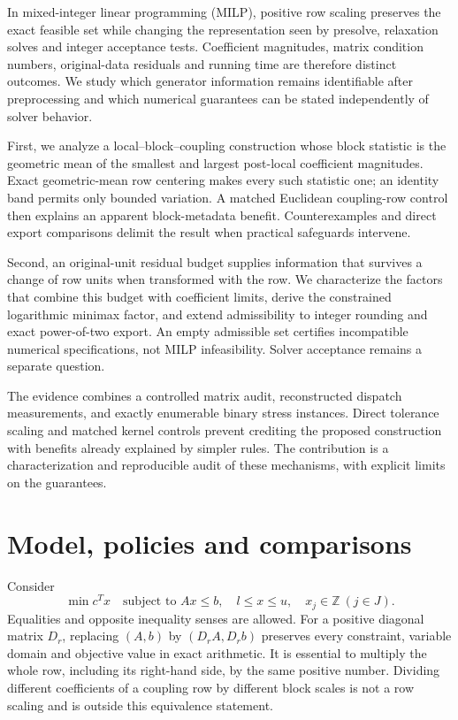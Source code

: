 \documentclass[11pt]{article}
\theoremstyle{definition}
\theoremstyle{remark}
\begin{document}
In mixed-integer linear programming (MILP), positive row scaling preserves the
exact feasible set while changing the representation seen by presolve, relaxation
solves and integer acceptance tests. Coefficient magnitudes, matrix condition numbers,
original-data residuals and running time are therefore distinct outcomes. We study
which generator information remains identifiable after preprocessing and which
numerical guarantees can be stated independently of solver behavior.

First, we analyze a local--block--coupling construction whose block statistic is the
geometric mean of the smallest and largest post-local coefficient magnitudes. Exact
geometric-mean row centering makes every such statistic one; an identity band permits
only bounded variation. A matched Euclidean coupling-row control then explains an
apparent block-metadata benefit. Counterexamples and direct export comparisons delimit
the result when practical safeguards intervene.

Second, an original-unit residual budget supplies information that survives a change
of row units when transformed with the row. We characterize the factors that combine
this budget with coefficient limits, derive the constrained logarithmic minimax
factor, and extend admissibility to integer rounding and exact power-of-two export.
An empty admissible set certifies incompatible numerical specifications, not MILP
infeasibility. Solver acceptance remains a separate question.

The evidence combines a controlled matrix audit, reconstructed dispatch measurements,
and exactly enumerable binary stress instances. Direct tolerance scaling and matched
kernel controls prevent crediting the proposed construction with benefits already
explained by simpler rules. The contribution is a characterization and reproducible
audit of these mechanisms, with explicit limits on the guarantees.



\section{Model, policies and comparisons}
\label{sec:model}
Consider
\[
 \min c^Tx\quad\text{subject to }Ax\le b,\quad l\le x\le u,\quad x_j\in\mathbb Z\ (j\in J).
\]
Equalities and opposite inequality senses are allowed. For a positive diagonal matrix
$D_r$, replacing $(A,b)$ by $(D_rA,D_rb)$ preserves every constraint, variable domain
and objective value in exact arithmetic. It is essential to multiply the whole row,
including its right-hand side, by the same positive number. Dividing different
coefficients of a coupling row by different block scales is not a row scaling and is
outside this equivalence statement.
\end{document}
